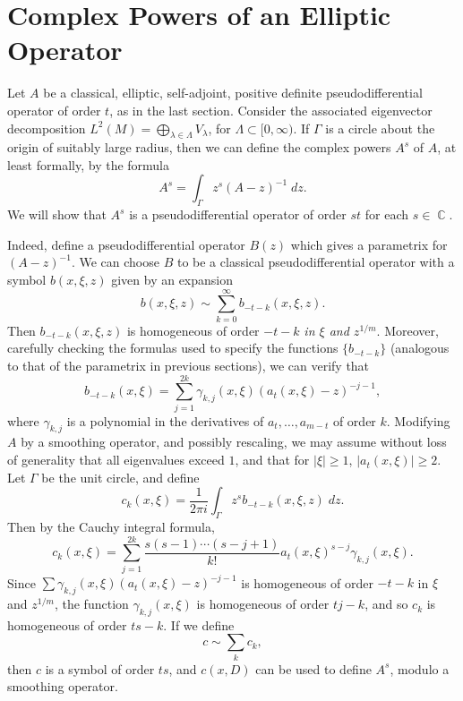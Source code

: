 \documentclass{article}
\DeclareMathOperator{\CC}{\mathbb{C}}
\theoremstyle{plain}
\theoremstyle{definition}
\begin{document}
\section{Complex Powers of an Elliptic Operator}

Let $A$ be a classical, elliptic, self-adjoint, positive definite pseudodifferential operator of order $t$, as in the last section. Consider the associated eigenvector decomposition $L^2(M) = \bigoplus_{\lambda \in \Lambda} V_\lambda$, for $\Lambda \subset [0,\infty)$.
%
%
If $\Gamma$ is a circle about the origin of suitably large radius, then we can define the complex powers $A^s$ of $A$, at least formally, by the formula
%
\[ A^s = \int_\Gamma z^s (A - z)^{-1}\; dz. \]
%
We will show that $A^s$ is a pseudodifferential operator of order $st$ for each $s \in \CC$.

Indeed, define a pseudodifferential operator $B(z)$ which gives a parametrix for $(A - z)^{-1}$. We can choose $B$ to be a classical pseudodifferential operator with a symbol $b(x,\xi,z)$ given by an expansion
%
\[ b(x,\xi,z) \sim \sum_{k = 0}^\infty b_{-t-k}(x,\xi,z). \]
%
Then $b_{-t-k}(x,\xi,z)$ is homogeneous of order $-t-k$ \emph{in $\xi$ and $z^{1/m}$}. Moreover, carefully checking the formulas used to specify the functions $\{ b_{-t-k} \}$ (analogous to that of the parametrix in previous sections), we can verify that
%
\[ b_{-t-k}(x,\xi) = \sum_{j = 1}^{2k} \gamma_{k,j}(x,\xi) ( a_t(x,\xi) - z )^{-j-1}, \]
%
where $\gamma_{k,j}$ is a polynomial in the derivatives of $a_t, \dots, a_{m-t}$ of order $k$.
%
%
Modifying $A$ by a smoothing operator, and possibly rescaling, we may assume without loss of generality that all eigenvalues exceed $1$, and that for $|\xi| \geq 1$, $|a_t(x,\xi)| \geq 2$. Let $\Gamma$ be the unit circle, and define
%
\[ c_k(x,\xi) = \frac{1}{2\pi i} \int_\Gamma z^s b_{-t-k}(x,\xi,z)\; dz. \]
%
Then by the Cauchy integral formula,
%
\[ c_k(x,\xi) = \sum_{j = 1}^{2k} \frac{s (s - 1) \cdots (s - j+1)}{k!} a_t(x,\xi)^{s-j} \gamma_{k,j}(x,\xi). \]
%
Since $\sum \gamma_{k,j}(x,\xi) ( a_t(x,\xi) - z)^{-j-1}$ is homogeneous of order $-t-k$ in $\xi$ and $z^{1/m}$, the function $\gamma_{k,j}(x,\xi)$ is homogeneous of order $tj - k$, and so $c_k$ is homogeneous of order $ts - k$. If we define
%
\[ c \sim \sum_k c_k, \]
%
then $c$ is a symbol of order $ts$, and $c(x,D)$ can be used to define $A^s$, modulo a smoothing operator.
\end{document}
